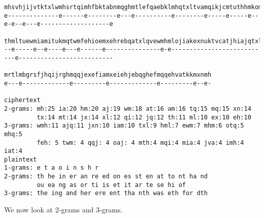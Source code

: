 \begin{Verbatim}[frame=single,fontsize=\tiny]
mhsvhjijvtktxlwmhsrtqimhfbktabnmqghmtlefqaebklmhqtxltvamqikjcmtuthhmkomhmiameiamhgthiqefajroajvatggm
e--------------e------e--------e---e----------e--------e-----e-----e--e-e--e---e-------------------e

thmltuewmiamitukmqtwmfehioemxehrebqatxlqvewmhmlojiakexnuktvcatjhiajqtxltumkkeojxnhethjxnhbrukjxnwejv
--e-----e--e----e---e------e---------------e-e---------------------------e--------------------------

mrtlmbgrsfjhqijrghmqqjexefiamxeiehjebqghefmqqehvatkkmxnmh
e---e-------------e---------e-------------e---------e--e-

ciphertext
2-grams: mh:25 ia:20 hm:20 aj:19 wm:18 at:16 am:16 tq:15 mq:15 xn:14
         tx:14 mt:14 jx:14 xl:12 qi:12 jq:12 th:11 ml:10 ex:10 eh:10
3-grams: wmh:11 ajq:11 jxn:10 iam:10 txl:9 hml:7 ewm:7 mhm:6 otq:5 mhq:5
         feh: 5 twm: 4 qqj: 4 oaj: 4 mth:4 mqi:4 mia:4 jva:4 imh:4 iat:4
plaintext
1-grams: e t a o i n s h r
2-grams: th he in er an re ed on es st en at to nt ha nd
         ou ea ng as or ti is et it ar te se hi of
3-grams: the ing and her ere ent tha nth was eth for dth
\end{Verbatim}
We now look at 2-grams and 3-grams.


